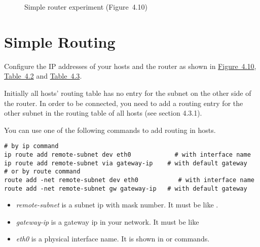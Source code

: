 \documentclass{../UTNetLab}
\begin{document}
\begin{figure}[H]
    \centering
    \caption{Simple router experiment (Figure~4.10)}\label{fig:4.10}
\end{figure}

\section{Simple Routing}
Configure the IP addresses of your hosts and the router as shown in \hyperref[fig:4.10]{Figure~4.10}, \hyperref[tab:4.2]{Table~4.2} and \hyperref[tab:4.3]{Table~4.3}.

Initially all hosts’ routing table has no entry for the subnet on the other side of the router.
In order to be connected, you need to add a routing entry for the other subnet in the routing table of all hosts (see section 4.3.1).

You can use one of the following commands to add routing in hosts.
\begin{lstlisting}[emph={eth0,gateway-ip,remote-subnet},morekeywords={[3]add,dev,via,gw}]
# by ip command
ip route add remote-subnet dev eth0            # with interface name
ip route add remote-subnet via gateway-ip    # with default gateway
# or by route command
route add -net remote-subnet dev eth0           # with interface name
route add -net remote-subnet gw gateway-ip   # with default gateway
    \end{lstlisting}
\begin{itemize}
    \item \textit{remote-subnet} is a subnet ip with mask number.
          It must be like .
    \item \textit{gateway-ip} is a gateway ip in your network.
          It must be like 
    \item \textit{eth0} is a physical interface name.
          It is shown in  or  commands.
\end{itemize}
\end{document}
